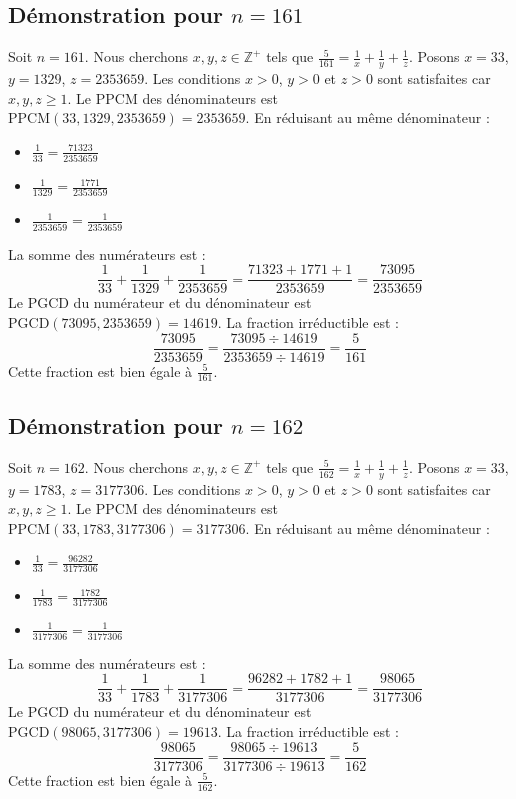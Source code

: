 \documentclass[11pt,a4paper]{article}
\begin{document}
\subsection{Démonstration pour $n = 161$}
Soit $n = 161$. Nous cherchons $x, y, z \in \mathbb{Z}^{+}$ tels que $\frac{5}{161} = \frac{1}{x} + \frac{1}{y} + \frac{1}{z}$.
Posons $x = 33$, $y = 1329$, $z = 2353659$.
Les conditions $x > 0$, $y > 0$ et $z > 0$ sont satisfaites car $x, y, z \geq 1$.
Le PPCM des dénominateurs est $\text{PPCM}(33, 1329, 2353659) = 2353659$.
En réduisant au même dénominateur :
\begin{itemize}
    \item $\frac{1}{33} = \frac{71323}{2353659}$
    \item $\frac{1}{1329} = \frac{1771}{2353659}$
    \item $\frac{1}{2353659} = \frac{1}{2353659}$
\end{itemize}
La somme des numérateurs est :
$$ \frac{1}{33} + \frac{1}{1329} + \frac{1}{2353659} = \frac{71323 + 1771 + 1}{2353659} = \frac{73095}{2353659} $$
Le PGCD du numérateur et du dénominateur est $\text{PGCD}(73095, 2353659) = 14619$.
La fraction irréductible est :
$$ \frac{73095}{2353659} = \frac{73095 \div 14619}{2353659 \div 14619} = \frac{5}{161} $$
Cette fraction est bien égale à $\frac{5}{161}$.

\subsection{Démonstration pour $n = 162$}
Soit $n = 162$. Nous cherchons $x, y, z \in \mathbb{Z}^{+}$ tels que $\frac{5}{162} = \frac{1}{x} + \frac{1}{y} + \frac{1}{z}$.
Posons $x = 33$, $y = 1783$, $z = 3177306$.
Les conditions $x > 0$, $y > 0$ et $z > 0$ sont satisfaites car $x, y, z \geq 1$.
Le PPCM des dénominateurs est $\text{PPCM}(33, 1783, 3177306) = 3177306$.
En réduisant au même dénominateur :
\begin{itemize}
    \item $\frac{1}{33} = \frac{96282}{3177306}$
    \item $\frac{1}{1783} = \frac{1782}{3177306}$
    \item $\frac{1}{3177306} = \frac{1}{3177306}$
\end{itemize}
La somme des numérateurs est :
$$ \frac{1}{33} + \frac{1}{1783} + \frac{1}{3177306} = \frac{96282 + 1782 + 1}{3177306} = \frac{98065}{3177306} $$
Le PGCD du numérateur et du dénominateur est $\text{PGCD}(98065, 3177306) = 19613$.
La fraction irréductible est :
$$ \frac{98065}{3177306} = \frac{98065 \div 19613}{3177306 \div 19613} = \frac{5}{162} $$
Cette fraction est bien égale à $\frac{5}{162}$.
\end{document}
